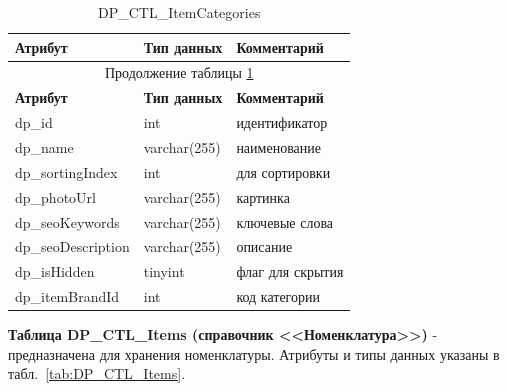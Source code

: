 \begin{longtable}{|p{5.5cm}|p{3.5cm}|p{7.5cm}|}
    \caption{DP\_CTL\_ItemCategories} \label{tab:DP_CTL_ItemCategories} \\
    \hline
    \textbf{Атрибут} & \textbf{Тип данных} & \textbf{Комментарий} \\ \hline
    \endfirsthead

    \multicolumn{3}{c}{Продолжение таблицы \ref{tab:DP_CTL_ItemCategories}} \\
    \hline
    \textbf{Атрибут} & \textbf{Тип данных} & \textbf{Комментарий} \\ \hline
    \endhead

    \endfoot

    \endlastfoot
    dp\_id & int & идентификатор \\ \hline
    dp\_name & varchar(255) & наименование \\ \hline
    dp\_sortingIndex & int & для сортировки \\ \hline
    dp\_photoUrl & varchar(255) & картинка\\ \hline
    dp\_seoKeywords & varchar(255) & ключевые слова \\ \hline
    dp\_seoDescription & varchar(255) & описание \\ \hline
    dp\_isHidden & tinyint & флаг для скрытия \\ \hline
    dp\_itemBrandId & int & код категории \\ \hline
\end{longtable}

\textbf{Таблица DP\_CTL\_Items (справочник <<Номенклатура>>)} - предназначена для хранения номенклатуры.
Атрибуты и типы данных указаны в табл.~\ref{tab:DP_CTL_Items}.

